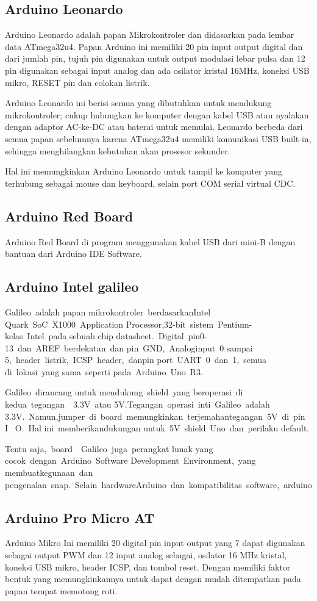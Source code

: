 \subsection {Arduino Leonardo}
Arduino Leonardo adalah papan Mikrokontroler dan didasarkan pada lembar data ATmega32u4. 
Papan Arduino ini memiliki 20 pin input output digital dan dari jumlah pin, tujuh pin digunakan untuk output modulasi lebar pulsa dan 12 pin digunakan sebagai input analog dan ada osilator kristal 16MHz, koneksi USB mikro, RESET pin dan colokan listrik.

Arduino Leonardo ini berisi semua yang dibutuhkan untuk mendukung mikrokontroler; cukup hubungkan ke komputer dengan kabel USB atau nyalakan dengan adaptor AC-ke-DC atau baterai untuk memulai. 
Leonardo berbeda dari semua papan sebelumnya karena ATmega32u4 memiliki komunikasi USB built-in, sehingga menghilangkan kebutuhan akan prosesor sekunder.

Hal ini memungkinkan Arduino Leonardo untuk tampil ke komputer yang terhubung sebagai mouse dan keyboard, selain port COM serial virtual CDC.

\subsection{Arduino Red Board}
Arduino Red Board di program menggunakan kabel USB dari mini-B dengan bantuan dari Arduino IDE Software.

\subsection{Arduino Intel galileo}
Galileo adalah papan mikrokontroler berdasarkanIntel Quark SoC X1000 Application Processor,32-bit sistem Pentium-kelas Intel pada sebuah chip datasheet. Digital pin0-13 dan AREF berdekatan dan pin GND, Analoginput 0 sampai 5, header listrik, ICSP header, danpin port UART 0 dan 1, semua di lokasi yang sama seperti pada Arduino Uno R3. 

Galileo dirancang untuk mendukung shield yang beroperasi di kedua tegangan  3.3V atau 5V.Tegangan operasi inti Galileo adalah 3.3V. Namun,jumper di board memungkinkan terjemahantegangan 5V di pin I  O. Hal ini memberikandukungan untuk 5V shield Uno dan perilaku default.

Tentu saja, board  Galileo juga perangkat lunak yang cocok dengan Arduino Software Development Environment, yang membuatkegunaan dan pengenalan snap. Selain hardwareArduino dan kompatibilitas software, arduino

\subsection{Arduino Pro Micro AT} 
Arduino Mikro Ini memiliki 20 digital pin input output yang 7 dapat digunakan sebagai output PWM dan 12 input analog sebagai, osilator 16 MHz kristal, koneksi USB mikro, header ICSP, dan tombol reset. Dengan  memiliki faktor bentuk yang memungkinkannya untuk dapat dengan mudah ditempatkan pada papan tempat memotong roti.